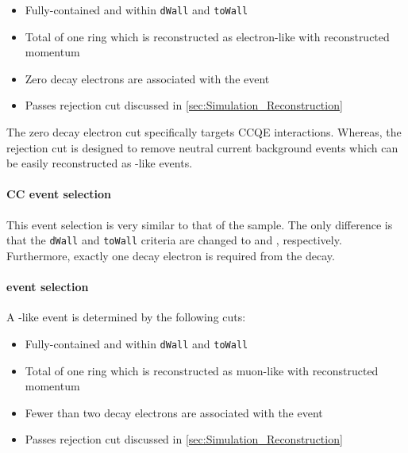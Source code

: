 \begin{itemize}
\item Fully-contained and within \texttt{dWall}  and \texttt{toWall} 
\item Total of one ring which is reconstructed as electron-like with reconstructed momentum 
\item Zero decay electrons are associated with the event
\item Passes  rejection cut discussed in \autoref{sec:Simulation_Reconstruction}
\end{itemize}

The zero decay electron cut specifically targets CCQE interactions. Whereas, the  rejection cut is designed to remove neutral current  background events which can be easily reconstructed as -like events.

\paragraph{CC\quickmath{1\pi^{+}} event selection} This event selection is very similar to that of the  sample. The only difference is that the \texttt{dWall} and \texttt{toWall} criteria are changed to  and , respectively. Furthermore, exactly one decay electron is required from the \quickmath{\pi^{+}} decay. 

\paragraph{ event selection}

A -like event is determined by the following cuts:

\begin{itemize}
\item Fully-contained and within \texttt{dWall}  and \texttt{toWall} 
\item Total of one ring which is reconstructed as muon-like with reconstructed momentum 
\item Fewer than two decay electrons are associated with the event
\item Passes \quickmath{\pi^{+}} rejection cut discussed in \autoref{sec:Simulation_Reconstruction}
\end{itemize}

